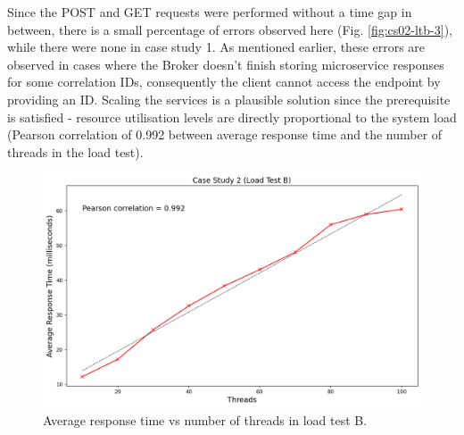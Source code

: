 Since the POST and GET requests were performed without a time gap in between, there is a small percentage of errors observed here (Fig. \ref{fig:cs02-ltb-3}), while there were none in case study 1. As mentioned earlier, these errors are observed in cases where the Broker doesn't finish storing microservice responses for some correlation IDs, consequently the client cannot access the endpoint by providing an ID. Scaling the services is a plausible solution since the prerequisite is satisfied - resource utilisation levels are directly proportional to the system load (Pearson correlation of 0.992 between average response time and the number of threads in the load test).

\begin{figure}[H]
  \centering
  \includegraphics[width=0.8\linewidth]{./assets/images/case-study-02/cs02-ltb-4.png}
  \caption{Average response time vs number of threads in load test B.}
  \label{fig:cs02-ltb-4}
\end{figure}
